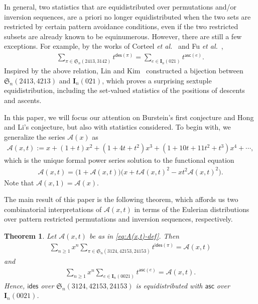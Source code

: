 \documentclass[reqno]{amsart}
\numberwithin{equation}{section}
\theoremstyle{plain}
\newtheorem{theorem}{Theorem}[section]
\theoremstyle{definition}
\theoremstyle{named}
\newcommand{\fS}{\mathfrak{S}}
\newcommand{\bI}{\mathbf{I}}
\newcommand{\asc}{\mathsf{asc}}
\newcommand{\des}{\mathsf{des}}
\newcommand{\ides}{\mathsf{ides}}
\newcommand{\cA}{\mathcal{A}}
\begin{document}
In general, two statistics that are equidistributed over permutations and/or inversion sequences, are a priori no longer equidistributed when the two sets are restricted by certain pattern avoidance conditions, even if the two restricted subsets are already known to be equinumerous. However, there are still a few exceptions. For example, by the works of Corteel \textit{et al.}~\cite{CMSW2016} and Fu \textit{et al.}~\cite{FLZ2018},
\begin{align}\label{eq:C-F}
	\sum_{\pi\in\fS_n(2413,3142)}t^{\des(\pi)} = \sum_{e\in\bI_n(021)} t^{\asc(e)}.
\end{align}
Inspired by the above relation,  Lin and Kim~\cite{LK2018} constructed a bijection between $\fS_n(2413,4213)$ and $\bI_n(021)$, which proves a surprising sextuple equidistribution, including the set-valued statistics of the positions of  descents and ascents.

In this paper, we will focus our attention on Burstein's first conjecture and Hong and Li's conjecture, but also with statistics considered. To begin with, we generalize the series $\cA(x)$ as
\begin{align}\label{eq:A(x,t)-def}
	\cA(x,t):=x + (1 + t) x^2 + (1 + 4 t + t^2) x^3 + (1 + 10 t + 11 t^2 + t^3) x^4 + \cdots,
\end{align}
which is the unique formal power series solution to the functional equation
\begin{align}\label{eq:A(x,t)-eqn}
	\cA(x,t)=\big(1+\cA(x,t)\big)\big(x+t \cA(x,t)^2 - xt^2 \cA(x,t)^2\big).
\end{align}
Note that $\cA(x,1)=\cA(x)$. %

The main result of this paper is the following theorem, which affords us two combinatorial interpretations of $\cA(x,t)$ in terms of the Eulerian distributions over pattern restricted permutations and inversion sequences, respectively.

\begin{theorem}
	Let $\cA(x,t)$ be as in \eqref{eq:A(x,t)-def}. Then
	\begin{align}\label{eq:P-gf}
		\sum_{n\ge 1}x^n\sum_{\pi\in\fS_n(3124, 42153, 24153)}t^{\ides(\pi)} = \cA(x,t)
	\end{align}
	and
	\begin{align}\label{eq:I-gf}
		\sum_{n\ge 1}x^n\sum_{e\in\bI_n(0021)}t^{\asc(e)} = \cA(x,t).
	\end{align}
	Hence, $\ides$ over $\fS_n(3124, 42153, 24153)$ is equidistributed with $\asc$ over $\bI_n(0021)$.
\end{theorem}
\end{document}
